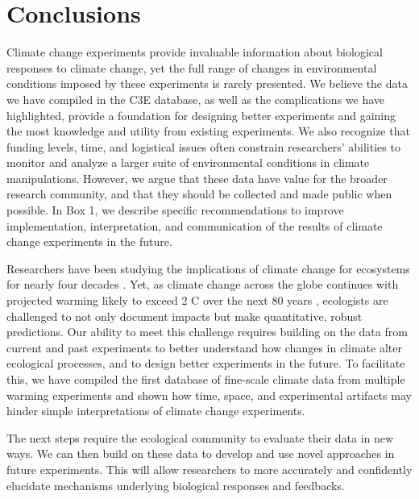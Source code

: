 \documentclass{article}
\begin{document}
\section* {Conclusions}
 \par Climate change experiments provide invaluable information about biological responses to climate change, yet the full range of changes in environmental conditions imposed by these experiments is rarely presented. We believe the data we have compiled in the C3E database, as well as the complications we have highlighted, provide a foundation for designing better experiments and gaining the most knowledge and utility from existing experiments. We also recognize that funding levels, time, and logistical issues often constrain researchers' abilities to monitor and analyze a larger suite of environmental conditions in climate manipulations. However, we argue that these data have value for the broader research community, and that they should be collected and made public when possible. In Box 1, we describe specific recommendations to improve implementation, interpretation, and communication of the results of climate change experiments in the future. %
 \par Researchers have been studying the implications of climate change for ecosystems for nearly four decades \citep[e.g.,][]{tamaki1981,carlson1982}.
Yet, as climate change across the globe continues with projected warming likely to exceed 2 \degree C over the next 80 years \citep{ipcc2013}, ecologists are challenged to not only document impacts but make quantitative, robust predictions. Our ability to meet this challenge requires building on the data from current and past experiments to better understand how changes in climate alter ecological processes, and to design better experiments in the future. To facilitate this, we have compiled the first database of fine-scale climate data from multiple warming experiments and shown how time, space, and experimental artifacts may hinder simple interpretations of climate change experiments. 

\par The next steps require the ecological community to evaluate their data in new ways. We can then build on these data to develop and use novel approaches in future experiments. This will allow researchers to more accurately and confidently elucidate mechanisms underlying biological responses and feedbacks.
\end{document}
